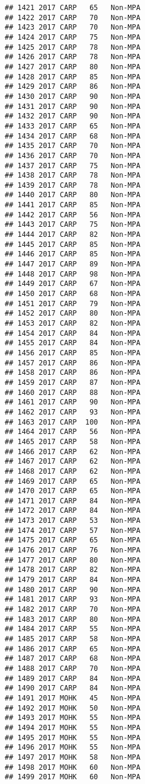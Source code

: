 \documentclass[]{article}
\begin{document}
\begin{verbatim}
## 1421 2017 CARP   65   Non-MPA
## 1422 2017 CARP   70   Non-MPA
## 1423 2017 CARP   70   Non-MPA
## 1424 2017 CARP   75   Non-MPA
## 1425 2017 CARP   78   Non-MPA
## 1426 2017 CARP   78   Non-MPA
## 1427 2017 CARP   80   Non-MPA
## 1428 2017 CARP   85   Non-MPA
## 1429 2017 CARP   86   Non-MPA
## 1430 2017 CARP   90   Non-MPA
## 1431 2017 CARP   90   Non-MPA
## 1432 2017 CARP   90   Non-MPA
## 1433 2017 CARP   65   Non-MPA
## 1434 2017 CARP   68   Non-MPA
## 1435 2017 CARP   70   Non-MPA
## 1436 2017 CARP   70   Non-MPA
## 1437 2017 CARP   75   Non-MPA
## 1438 2017 CARP   78   Non-MPA
## 1439 2017 CARP   78   Non-MPA
## 1440 2017 CARP   80   Non-MPA
## 1441 2017 CARP   85   Non-MPA
## 1442 2017 CARP   56   Non-MPA
## 1443 2017 CARP   75   Non-MPA
## 1444 2017 CARP   82   Non-MPA
## 1445 2017 CARP   85   Non-MPA
## 1446 2017 CARP   85   Non-MPA
## 1447 2017 CARP   89   Non-MPA
## 1448 2017 CARP   98   Non-MPA
## 1449 2017 CARP   67   Non-MPA
## 1450 2017 CARP   68   Non-MPA
## 1451 2017 CARP   79   Non-MPA
## 1452 2017 CARP   80   Non-MPA
## 1453 2017 CARP   82   Non-MPA
## 1454 2017 CARP   84   Non-MPA
## 1455 2017 CARP   84   Non-MPA
## 1456 2017 CARP   85   Non-MPA
## 1457 2017 CARP   86   Non-MPA
## 1458 2017 CARP   86   Non-MPA
## 1459 2017 CARP   87   Non-MPA
## 1460 2017 CARP   88   Non-MPA
## 1461 2017 CARP   90   Non-MPA
## 1462 2017 CARP   93   Non-MPA
## 1463 2017 CARP  100   Non-MPA
## 1464 2017 CARP   56   Non-MPA
## 1465 2017 CARP   58   Non-MPA
## 1466 2017 CARP   62   Non-MPA
## 1467 2017 CARP   62   Non-MPA
## 1468 2017 CARP   62   Non-MPA
## 1469 2017 CARP   65   Non-MPA
## 1470 2017 CARP   65   Non-MPA
## 1471 2017 CARP   84   Non-MPA
## 1472 2017 CARP   84   Non-MPA
## 1473 2017 CARP   53   Non-MPA
## 1474 2017 CARP   57   Non-MPA
## 1475 2017 CARP   65   Non-MPA
## 1476 2017 CARP   76   Non-MPA
## 1477 2017 CARP   80   Non-MPA
## 1478 2017 CARP   82   Non-MPA
## 1479 2017 CARP   84   Non-MPA
## 1480 2017 CARP   90   Non-MPA
## 1481 2017 CARP   93   Non-MPA
## 1482 2017 CARP   70   Non-MPA
## 1483 2017 CARP   80   Non-MPA
## 1484 2017 CARP   55   Non-MPA
## 1485 2017 CARP   58   Non-MPA
## 1486 2017 CARP   65   Non-MPA
## 1487 2017 CARP   68   Non-MPA
## 1488 2017 CARP   70   Non-MPA
## 1489 2017 CARP   84   Non-MPA
## 1490 2017 CARP   84   Non-MPA
## 1491 2017 MOHK   45   Non-MPA
## 1492 2017 MOHK   50   Non-MPA
## 1493 2017 MOHK   55   Non-MPA
## 1494 2017 MOHK   55   Non-MPA
## 1495 2017 MOHK   55   Non-MPA
## 1496 2017 MOHK   55   Non-MPA
## 1497 2017 MOHK   58   Non-MPA
## 1498 2017 MOHK   60   Non-MPA
## 1499 2017 MOHK   60   Non-MPA

\end{verbatim}
\end{document}
